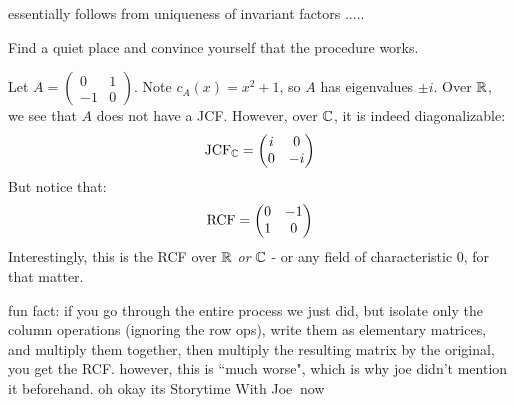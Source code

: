 \begin{pf}[source=Primary Source Material]
    essentially follows from uniqueness of invariant factors .....
\end{pf}

\begin{exr}[source=Primary Source Material]
    Find a quiet place and convince yourself that the procedure works.
\end{exr}

\begin{xmp}[source=Primary Source Material]
    Let $ A = \begin{pmatrix}
        0 & 1 \\ -1 & 0
    \end{pmatrix} $. Note $ c_{A}(x) = x^{2}+1 $, so $ A $ has eigenvalues
    $ \pm i $. \vsp
    Over $ \mathbb{R} $, we see that $ A $ does not have a JCF.
    However, over $ \mathbb{C} $, it is indeed diagonalizable:
    \begin{equation*}
        \textrm{JCF}_{\mathbb{C}} = \begin{pmatrix}
            i & 0 \\ 0 & -i
        \end{pmatrix}
    \end{equation*}
    But notice that:
    \begin{equation*}
        \textrm{RCF} = \begin{pmatrix}
            0 & -1 \\ 1 & 0
        \end{pmatrix}
    \end{equation*}
    Interestingly, this is the RCF over $ \mathbb{R} $ \textit{or} $ \mathbb{C} $ - or
    any field of characteristic 0, for that matter.
\end{xmp}
fun fact: if you go through the entire process we just did, but isolate only the
column operations (ignoring the row ops), write them as elementary matrices, and
multiply them together, then multiply the resulting matrix by the original, you
get the RCF. however, this is ``much worse", which is why joe didn't mention it
beforehand. oh okay its Storytime With Joe\texttrademark $ \ $ now
